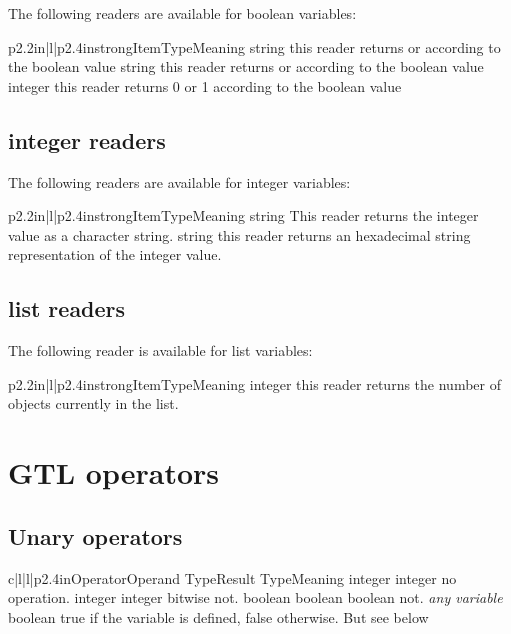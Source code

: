 The following readers are available for boolean variables:

\begin{longtableiii}{p{2.2in}|l|p{2.4in}}{strong}{Item}{Type}{Meaning}
  {string}
  {this reader returns  or  according to the boolean value}
  {string}
  {this reader returns  or  according to the boolean value}
  {integer}
  {this reader returns 0 or 1 according to the boolean value}
\end{longtableiii}

\subsection{integer readers}

The following readers are available for integer variables:

\begin{longtableiii}{p{2.2in}|l|p{2.4in}}{strong}{Item}{Type}{Meaning}
  {string}
  {This reader returns the integer value as a character string.}
  {string}
  {this reader returns an hexadecimal string representation of the integer value.}
\end{longtableiii}

\subsection{list readers}

The following reader is available for list variables:

\begin{longtableiii}{p{2.2in}|l|p{2.4in}}{strong}{Item}{Type}{Meaning}
  {integer}
  {this reader returns the number of objects currently in the list.}
\end{longtableiii}

\section{GTL operators}

\subsection{Unary operators}

\begin{longtableiv}{c|l|l|p{2.4in}}{}{Operator}{Operand Type}{Result Type}{Meaning}
  \lineiv{+}
  {integer}
  {integer}
  {no operation.}
  \lineiv{$\sim$}
  {integer}
  {integer}
  {bitwise not.}
  {boolean}
  {boolean}
  {boolean not.}
  {{\em any variable}}
  {boolean}
  {true if the variable is defined, false otherwise. But see below}
\end{longtableiv}

